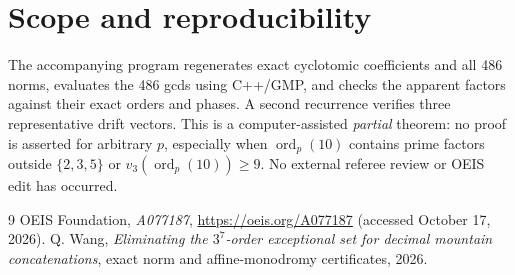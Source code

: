 \documentclass[9pt]{extarticle}
\DeclareMathOperator{\ord}{ord}
\begin{document}
\section{Scope and reproducibility}
The accompanying program regenerates exact cyclotomic coefficients and all 486 norms, evaluates the 486 gcds using C++/GMP, and checks the apparent factors against their exact orders and phases. A second recurrence verifies three representative drift vectors. This is a computer-assisted \emph{partial} theorem: no proof is asserted for arbitrary $p$, especially when $\ord_p(10)$ contains prime factors outside $\{2,3,5\}$ or $v_3(\ord_p(10))\ge9$. No external referee review or OEIS edit has occurred.
\begin{thebibliography}{9}
 OEIS Foundation, \emph{A077187}, \url{https://oeis.org/A077187} (accessed October 17, 2026).
 Q. Wang, \emph{Eliminating the $3^7$-order exceptional set for decimal mountain concatenations}, exact norm and affine-monodromy certificates, 2026.
\end{thebibliography}
\end{document}
